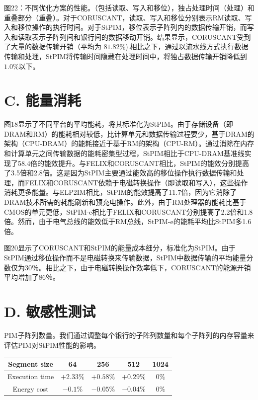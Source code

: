 \documentclass[10pt]{article}
\begin{document}
图22：不同优化方案的性能。（包括读取、写入和移位），独占处理时间（处理）和重叠部分（重叠）。对于CORUSCANT，读取、写入和移位分别表示RM读取、写入和移位操作的执行时间。对于StPIM，移位表示子阵列内的数据传输开销，而写入和读取表示子阵列间和银行间的数据移动开销。结果显示，CORUSCANT受到了大量的数据传输开销（平均为 $81.82 \%$).相比之下，通过以流水线方式执行数据传输和处理，StPIM将传输时间隐藏在处理时间中，将独占数据传输开销降低到$1.0\%$以下。

\section*{C. 能量消耗}
图18显示了不同平台的平均能耗，将其标准化为StPIM。由于存储设备（即DRAM和RM）的能耗相对较低，比计算单元和数据传输过程要少，基于DRAM的架构（CPU-DRAM）的能耗接近于基于RM的架构（CPU-RM）。通过消除在内存和计算单元之间传输数据的能耗密集型过程，StPIM相比于CPU-DRAM基准线实现了58.4倍的能效提升。与FELIX和CORUSCANT相比，StPIM的能效分别提高了3.5倍和2.8倍。这是因为StPIM主要通过能效高的移位操作执行数据传输和处理，而FELIX和CORUSCANT依赖于电磁转换操作（即读取和写入），这些操作消耗更多能量。与ELP2IM相比，StPIM的能效提高了11.7倍，因为它消除了DRAM技术所需的耗能刷新和预充电操作。此外，由于RM处理器的能耗比基于CMOS的单元更低，StPIM-e相比于FELIX和CORUSCANT分别提高了2.2倍和1.8倍。然而，由于电气总线的能效低于RM总线，StPIM-e的能耗平均比StPIM多1.6倍。

图20显示了CORUSCANT和StPIM的能量成本细分，标准化为StPIM。由于StPIM通过移位操作而不是电磁转换来传输数据，StPIM中数据传输的平均能量分数仅为30％。相比之下，由于电磁转换操作效率低下，CORUSCANT的能源开销平均增加了86％。








\section*{D. 敏感性测试}

PIM子阵列数量。我们通过调整每个银行的子阵列数量和每个子阵列的内存容量来评估PIM对StPIM性能的影响。






\begin{center}
\begin{tabular}{|c|c|c|c|c|}
\hline
Segment size & 64 & 256 & 512 & 1024 \\
\hline
Execution time & $+2.33 \%$ & $+0.58 \%$ & $+0.29 \%$ & $0 \%$ \\
\hline
Energy cost & $-0.1 \%$ & $-0.05 \%$ & $-0.04 \%$ & $0 \%$ \\
\hline
\end{tabular}
\end{center}
\end{document}
